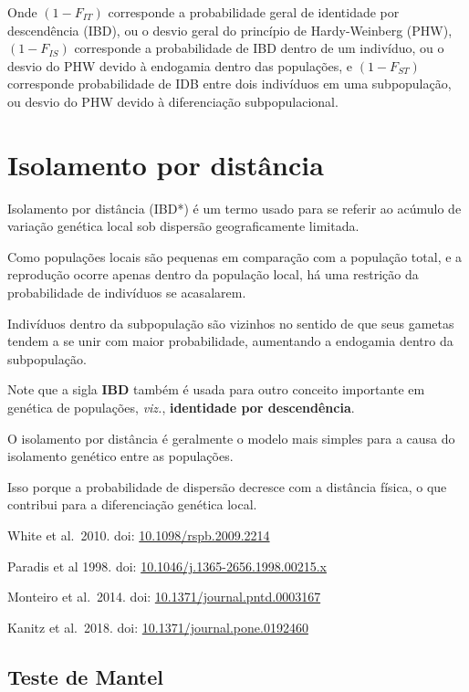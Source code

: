 \documentclass[
]{book}
\begin{document}
Onde
\(\left( 1-F_{IT} \right)\) corresponde a probabilidade geral de identidade por descendência (IBD), ou o desvio geral do princípio de Hardy-Weinberg (PHW),
\(\left( 1-F_{IS} \right )\) corresponde a probabilidade de IBD dentro de um indivíduo, ou o desvio do PHW devido à endogamia dentro das populações, e
\(\left( 1-F_{ST} \right)\) corresponde probabilidade de IDB entre dois indivíduos em uma subpopulação, ou desvio do PHW devido à diferenciação subpopulacional.

\hypertarget{isolamento-por-distuxe2ncia}{%
\section{Isolamento por distância}\label{isolamento-por-distuxe2ncia}}

Isolamento por distância (IBD*) é um termo usado para se referir ao acúmulo de variação genética local sob dispersão geograficamente limitada.

Como populações locais são pequenas em comparação com a população total, e a reprodução ocorre apenas dentro da população local, há uma restrição da probabilidade de indivíduos se acasalarem.

Indivíduos dentro da subpopulação são vizinhos no sentido de que seus gametas tendem a se unir com maior probabilidade, aumentando a endogamia dentro da subpopulação.

Note que a sigla \textbf{IBD} também é usada para outro conceito importante em genética de populações, \emph{viz.}, \textbf{identidade por descendência}.

O isolamento por distância é geralmente o modelo mais simples para a causa do isolamento genético entre as populações.

Isso porque a probabilidade de dispersão decresce com a distância física, o que contribui para a diferenciação genética local.

White et al.~2010. doi: \href{https://doi.org/10.1098/rspb.2009.2214}{10.1098/rspb.2009.2214}

Paradis et al 1998. doi: \href{https://doi.org/10.1046/j.1365-2656.1998.00215.x}{10.1046/j.1365-2656.1998.00215.x}

Monteiro et al.~2014. doi: \href{https://doi.org/10.1371/journal.pntd.0003167}{10.1371/journal.pntd.0003167}

Kanitz et al.~2018. doi: \href{https://doi.org/10.1371/journal.pone.0192460}{10.1371/journal.pone.0192460}

\hypertarget{teste-de-mantel}{%
\subsection{Teste de Mantel}\label{teste-de-mantel}}
\end{document}
